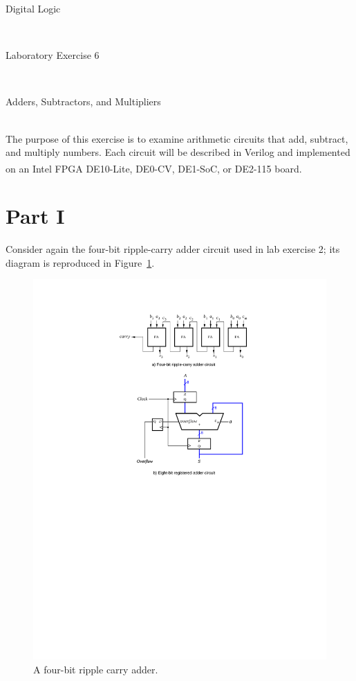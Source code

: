\documentclass[epsfig,10pt,fullpage]{article}
\newcommand{\LabNum}{6}
\begin{document}
\centerline{\huge Digital Logic}
~\\
\centerline{\huge Laboratory Exercise \LabNum}
~\\
\centerline{\large Adders, Subtractors, and Multipliers}
~\\

The purpose of this exercise is to examine arithmetic circuits that add, subtract,
and multiply numbers. Each circuit will be described in Verilog and implemented on an 
Intel\textsuperscript{\textregistered} FPGA DE10-Lite, DE0-CV, DE1-SoC, or DE2-115 board.

\section*{Part I}
Consider again the four-bit ripple-carry adder circuit used in lab exercise 2; its diagram 
is reproduced in Figure~\ref{fig:ripple_carry}.

\begin{figure}[H]
\centerline{
\includegraphics{figures/ripple_carry}}
\caption{A four-bit ripple carry adder.}
\label{fig:ripple_carry}
\end{figure}
\end{document}
